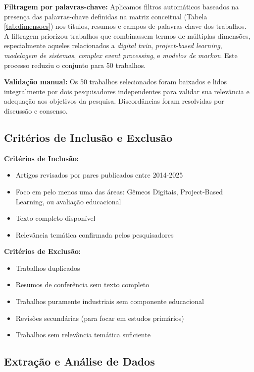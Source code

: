 \documentclass[english, spanish, brazilian]{RBIEarticle} %
\begin{document}
\textbf{Filtragem por palavras-chave:} Aplicamos filtros automáticos baseados na presença das palavras-chave definidas na matriz conceitual (Tabela \ref{tab:dimensoes}) nos títulos, resumos e campos de palavras-chave dos trabalhos. A filtragem priorizou trabalhos que combinassem termos de múltiplas dimensões, especialmente aqueles relacionados a \textit{digital twin}, \textit{project-based learning}, \textit{modelagem de sistemas}, \textit{complex event processing}, e \textit{modelos de markov}. Este processo reduziu o conjunto para 50 trabalhos.

\textbf{Validação manual:} Os 50 trabalhos selecionados foram baixados e lidos integralmente por dois pesquisadores independentes para validar sua relevância e adequação aos objetivos da pesquisa. Discordâncias foram resolvidas por discussão e consenso.

\subsection{Critérios de Inclusão e Exclusão}

\textbf{Critérios de Inclusão:}
\begin{itemize}
    \item Artigos revisados por pares publicados entre 2014-2025
    \item Foco em pelo menos uma das áreas: Gêmeos Digitais, Project-Based Learning, ou avaliação educacional
    \item Texto completo disponível
    \item Relevância temática confirmada pelos pesquisadores
\end{itemize}

\textbf{Critérios de Exclusão:}
\begin{itemize}
    \item Trabalhos duplicados
    \item Resumos de conferência sem texto completo
    \item Trabalhos puramente industriais sem componente educacional
    \item Revisões secundárias (para focar em estudos primários)
    \item Trabalhos sem relevância temática suficiente
\end{itemize}

\subsection{Extração e Análise de Dados}
\end{document}
